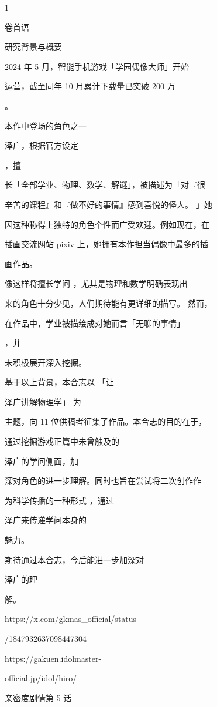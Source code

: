 1\par
卷首语\par
研究背景与概要\par
2024 年 5 月，智能手机游戏「学园偶像大师」开始\par
运营，截至同年 10 月累计下载量已突破 200 万\par
[1]\par
。\par
本作中登场的角色之一\par
泽广，根据官方设定\par
[2]\par
，擅\par
长「全部学业、物理、数学、解谜」，被描述为「对『很\par
辛苦的课程』和『做不好的事情』感到喜悦的怪人。 」她\par
因这种称得上独特的角色个性而广受欢迎。例如现在，在\par
插画交流网站 pixiv 上，她拥有本作担当偶像中最多的插\par
画作品。\par
像这样将擅长学问 ，尤其是物理和数学明确表现出\par
来的角色十分少见，人们期待能有更详细的描写。 然而，\par
在作品中，学业被描绘成对她而言「无聊的事情」\par
[3]\par
，并\par
未积极展开深入挖掘。\par
基于以上背景，本合志以 「让\par
泽广讲解物理学」 为\par
主题，向 11 位供稿者征集了作品。本合志的目的在于，\par
通过挖掘游戏正篇中未曾触及的\par
泽广的学问侧面，加\par
深对角色的进一步理解。同时也旨在尝试将二次创作作\par
为科学传播的一种形式 ，通过\par
泽广来传递学问本身的\par
魅力。\par
期待通过本合志，今后能进一步加深对\par
泽广的理\par
解。\par
[1]https://x.com/gkmas\_official/status\par
/1847932637098447304\par
[2]https://gakuen.idolmaster-\par
official.jp/idol/hiro/\par
[3]亲密度剧情第 5 话\par

